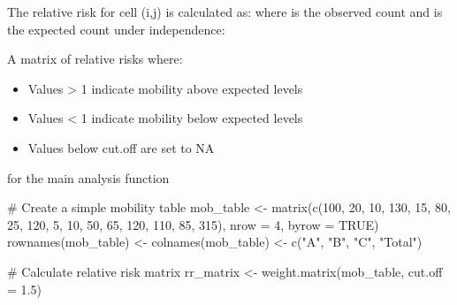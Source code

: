 \documentclass[a4paper]{book}
\begin{document}
%
\begin{Details}
The relative risk for cell (i,j) is calculated as:
where  is the observed count and  is the expected
count under independence: 
\end{Details}
%
\begin{Value}
A matrix of relative risks where:
\begin{itemize}

\item{} Values > 1 indicate mobility above expected levels
\item{} Values < 1 indicate mobility below expected levels  
\item{} Values below cut.off are set to NA

\end{itemize}

\end{Value}
%
\begin{SeeAlso}
 for the main analysis function
\end{SeeAlso}
%
\begin{Examples}
\begin{ExampleCode}
# Create a simple mobility table
mob_table <- matrix(c(100, 20, 10, 130,
                      15, 80, 25, 120,  
                      5,  10, 50,  65,
                      120, 110, 85, 315), 
                    nrow = 4, byrow = TRUE)
rownames(mob_table) <- colnames(mob_table) <- c("A", "B", "C", "Total")

# Calculate relative risk matrix
rr_matrix <- weight.matrix(mob_table, cut.off = 1.5)

\end{ExampleCode}
\end{Examples}
\printindex{}
\end{document}
